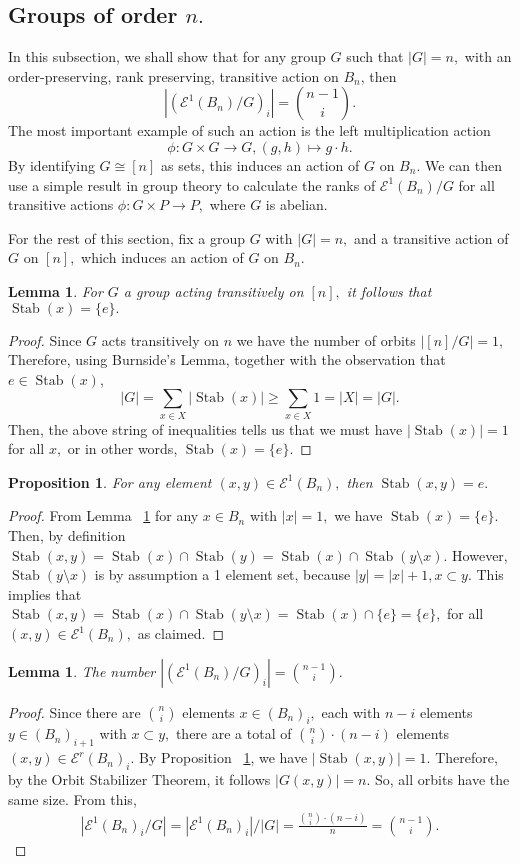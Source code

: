 \documentclass[10 pt]{amsart}
\theoremstyle{plain}
\newtheorem{prop}[thm]{Proposition}
\newtheorem{lem}[thm]{Lemma}
\theoremstyle{definition}
\theoremstyle{remark}
\numberwithin{equation}{section}
\newcommand\ssec{\subsection}
\def\Stab{\operatorname{Stab}}
\begin{document}
\ssec{Groups of order $n.$}

In this subsection, we shall show that for any group $G$ such that $|G| = n,$ with an order-preserving, rank preserving, transitive action on $B_n$, then $$|(\mathcal E^1(B_n)/G)_i| = \binom {n-1}{i}.$$ The most important example of such an action is the left multiplication action $$\phi: G\times G \rightarrow G,(g,h)\mapsto g \cdot h.$$ By identifying $G \cong [n]$ as sets, this induces an action of $G$ on $B_n.$ We can then use a simple result in group theory to calculate the ranks of $\mathcal E^1(B_n)/G$ for all transitive actions $\phi:G\times P \rightarrow P,$ where $G$ is abelian.

For the rest of this section, fix a group $G$ with $|G| = n,$ and a transitive action of $G$ on $[n],$ which induces an action of $G$ on $B_n.$

\begin{lem}
\label{lem:stabilizer_one}
For $G$ a group acting transitively on $[n],$ it follows that $\Stab(x) = \{e\}.$
\end{lem}
\begin{proof}
Since $G$ acts transitively on $n$ we have the number of orbits $|[n]/G| = 1,$ Therefore, using Burnside's Lemma, together with the observation that $e \in \Stab(x)$,
$$|G| = \sum_{x\in X}|\Stab(x)|\geq \sum_{x \in X} 1=|X|= |G|.$$
Then, the above string of inequalities tells us that we must have $|\Stab(x)| = 1$ for all $x,$ or in other words, $\Stab(x) = \{e\}.$
\end{proof}

\begin{prop}
\label{prop:stabilizer_edge}
For any element $(x , y) \in \mathcal E^1(B_n),$ then $\Stab(x, y) = e.$
\end{prop}
\begin{proof}
From Lemma ~\ref{lem:stabilizer_one} for any $x \in B_n$ with $|x| = 1,$ we have $\Stab(x) = \{e\}.$ Then, by definition $\Stab(x, y) = \Stab(x) \cap \Stab(y) = \Stab(x) \cap \Stab(y \setminus x).$ However, $\Stab(y \setminus x)$ is by assumption a 1 element set, because $|y| = |x| +1,x \subset y.$ This implies that $\Stab(x, y)=\Stab(x) \cap \Stab(y \setminus x) = \Stab(x) \cap \{e\} = \{e\},$ for all $(x, y) \in \mathcal E^1(B_n),$ as claimed.
\end{proof}

\begin{lem}
\label{lem:q_counts}
The number $\displaystyle |(\mathcal E^1(B_n)/G)_i| = \binom{n-1}{i}.$
\end{lem}
\begin{proof}
Since there are $\binom{n}{i}$ elements $x\in(B_n)_i,$ each with $n-i$ elements $y \in (B_n)_{i+1}$ with $x \subset y,$ there are a total of $\binom{n}{i}\cdot (n-i)$ elements $(x, y) \in \mathcal E^r(B_n)_i.$ By Proposition ~\ref{prop:stabilizer_edge}, we have $|\Stab(x, y)| = 1.$ Therefore, by the Orbit Stabilizer Theorem, it follows $|G(x, y)| = n.$ So, all orbits have the same size. From this,
\begin{align*}
|\mathcal E^1(B_n)_i/G| = |\mathcal E^1(B_n)_i|/|G| = \frac{\binom{n}{i}\cdot (n-i)}{n} = \binom {n-1}{i}.
\end{align*}
\end{proof}
\end{document}

